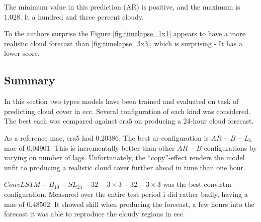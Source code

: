The minimum value in this prediction (AR) is positive, and the maximum is $1.028$. It a hundred and three percent cloudy. 

To the authors surprise the Figure \ref{fig:timelapse_1x1} appears to have a more realistic cloud forecast than \ref{fig:timelapse_3x3}, which is surprising - It has a lower score.




\subsection{Summary} \label{sec:summary_num}
In this section %
two types models have been trained and evaluated on task of predicting cloud cover in \acrshort{ecc}.
Several configuration of each kind was considered. The best each was compared against \acrshort{era5} on producing a 24-hour cloud forecast.

As a reference \acrshort{mae}, \acrshort{era5} had $0.20386$. 
The best \acrshort{ar}-configuration is $AR-B-L_5$ \acrshort{mae} of $0.04901$. This is incrementally better than other $AR-B$-configurations by varying on number of lags. Unfortunately, the ``copy''-effect renders the model unfit to producing a realistic cloud cover further ahead in time than one hour. 

$ConvLSTM-B_{10}-SL_{24}-32-3\times3-32-3\times3$ was the best \acrshort{convlstm}-configuration. 
Measured over the entire test period i did rather badly, having a \acrshort{mae} of $0.48502$. It showed skill when producing the forecast, a few hours into the forecast it was able to reproduce the cloudy regions in \acrshort{ecc}.  



